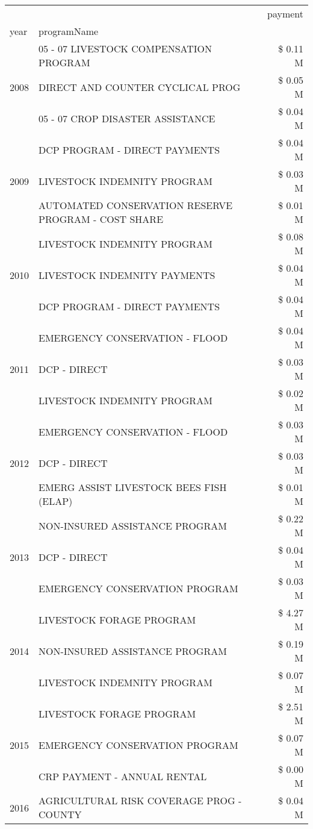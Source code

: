 \begin{tabular}{llr}
\toprule
 &  & payment \\
year & programName &  \\
\midrule
\multirow[t]{3}{*}{2008} & 05 - 07 LIVESTOCK COMPENSATION PROGRAM & \$ 0.11 M \\
 & DIRECT AND COUNTER CYCLICAL PROG & \$ 0.05 M \\
 & 05 - 07 CROP DISASTER ASSISTANCE & \$ 0.04 M \\
\cline{1-3}
\multirow[t]{3}{*}{2009} & DCP PROGRAM - DIRECT PAYMENTS & \$ 0.04 M \\
 & LIVESTOCK INDEMNITY PROGRAM & \$ 0.03 M \\
 & AUTOMATED CONSERVATION RESERVE PROGRAM - COST SHARE & \$ 0.01 M \\
\cline{1-3}
\multirow[t]{3}{*}{2010} & LIVESTOCK INDEMNITY PROGRAM & \$ 0.08 M \\
 & LIVESTOCK INDEMNITY PAYMENTS & \$ 0.04 M \\
 & DCP PROGRAM - DIRECT PAYMENTS & \$ 0.04 M \\
\cline{1-3}
\multirow[t]{3}{*}{2011} & EMERGENCY CONSERVATION - FLOOD & \$ 0.04 M \\
 & DCP - DIRECT & \$ 0.03 M \\
 & LIVESTOCK INDEMNITY PROGRAM & \$ 0.02 M \\
\cline{1-3}
\multirow[t]{3}{*}{2012} & EMERGENCY CONSERVATION - FLOOD & \$ 0.03 M \\
 & DCP - DIRECT & \$ 0.03 M \\
 & EMERG ASSIST LIVESTOCK BEES FISH (ELAP) & \$ 0.01 M \\
\cline{1-3}
\multirow[t]{3}{*}{2013} & NON-INSURED ASSISTANCE PROGRAM & \$ 0.22 M \\
 & DCP - DIRECT & \$ 0.04 M \\
 & EMERGENCY CONSERVATION PROGRAM & \$ 0.03 M \\
\cline{1-3}
\multirow[t]{3}{*}{2014} & LIVESTOCK FORAGE PROGRAM & \$ 4.27 M \\
 & NON-INSURED ASSISTANCE PROGRAM & \$ 0.19 M \\
 & LIVESTOCK INDEMNITY PROGRAM & \$ 0.07 M \\
\cline{1-3}
\multirow[t]{3}{*}{2015} & LIVESTOCK FORAGE PROGRAM & \$ 2.51 M \\
 & EMERGENCY CONSERVATION PROGRAM & \$ 0.07 M \\
 & CRP PAYMENT - ANNUAL RENTAL & \$ 0.00 M \\
\cline{1-3}
\multirow[t]{3}{*}{2016} & AGRICULTURAL RISK COVERAGE PROG - COUNTY & \$ 0.04 M \\

\end{tabular}
